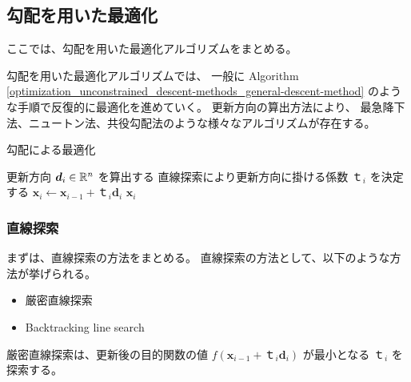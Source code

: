 %

\subsection{勾配を用いた最適化}

ここでは、勾配を用いた最適化アルゴリズムをまとめる。

勾配を用いた最適化アルゴリズムでは、
一般に
Algorithm \ref{optimization_unconstrained_descent-methods_general-descent-method}
のような手順で反復的に最適化を進めていく。
更新方向の算出方法により、
最急降下法、ニュートン法、共役勾配法のような様々なアルゴリズムが存在する。

\begin{algorithm}[hp]
    \caption{勾配による最適化}
    \label{optimization_unconstrained_descent-methods_general-descent-method}
    \begin{algorithmic}
                \State 更新方向 $\bm{d}_i \in \mathbb{R}^n$ を算出する
                \State 直線探索により更新方向に掛ける係数 $ｔ_i$ を決定する
                \State $\bm{x}_i \gets \bm{x}_{i-1} + ｔ_i \bm{d}_i$
                    \State \Return $\bm{x}_i$
                \EndIf
            \EndFor
        \EndProcedure
    \end{algorithmic}
\end{algorithm}

\subsubsection{直線探索}

まずは、直線探索の方法をまとめる。
直線探索の方法として、以下のような方法が挙げられる。

\begin{itemize}
    \item 厳密直線探索
    \item Backtracking line search
\end{itemize}

厳密直線探索は、更新後の目的関数の値
$f(\bm{x}_{i-1} + ｔ_i \bm{d}_i)$
が最小となる $ｔ_i$ を探索する。

